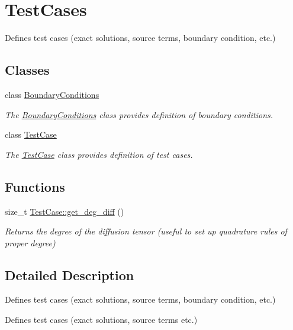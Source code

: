 \hypertarget{group__TestCases}{}\section{Test\+Cases}
\label{group__TestCases}


Defines test cases (exact solutions, source terms, boundary condition, etc.)  


\subsection*{Classes}
\begin{DoxyCompactItemize}
\item 
class \hyperlink{classBoundaryConditions}{Boundary\+Conditions}
\begin{DoxyCompactList}\small\item\em The \hyperlink{classBoundaryConditions}{Boundary\+Conditions} class provides definition of boundary conditions. \end{DoxyCompactList}\item 
class \hyperlink{classTestCase}{Test\+Case}
\begin{DoxyCompactList}\small\item\em The \hyperlink{classTestCase}{Test\+Case} class provides definition of test cases. \end{DoxyCompactList}\end{DoxyCompactItemize}
\subsection*{Functions}
\begin{DoxyCompactItemize}
\item 
\mbox{\label{group__TestCases_ga3dd2daaebb012281b252ab65db0045b2}} 
size\+\_\+t \hyperlink{group__TestCases_ga3dd2daaebb012281b252ab65db0045b2}{Test\+Case\+::get\+\_\+deg\+\_\+diff} ()
\begin{DoxyCompactList}\small\item\em Returns the degree of the diffusion tensor (useful to set up quadrature rules of proper degree) \end{DoxyCompactList}\end{DoxyCompactItemize}


\subsection{Detailed Description}
Defines test cases (exact solutions, source terms, boundary condition, etc.) 

Defines test cases (exact solutions, source terms etc.)